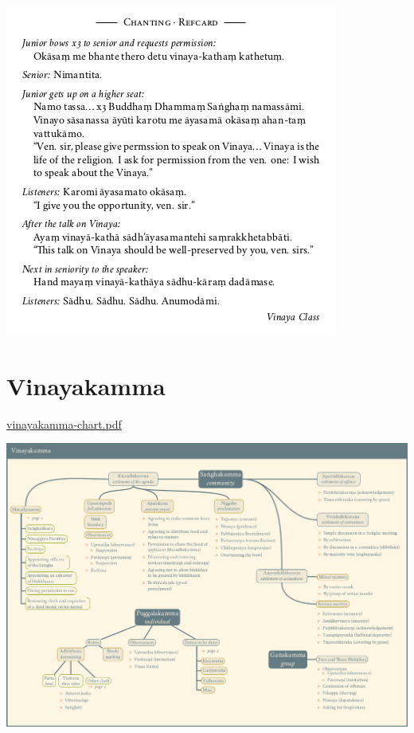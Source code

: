 \href{./includes/docs/chanting-refcard.pdf}{\includegraphics{./includes/docs/chanting-refcard-thumb.png}}

\section{Vinayakamma}

\href{./includes/docs/vinayakamma-chart.pdf}{vinayakamma-chart.pdf}

\href{./includes/docs/vinayakamma-chart.pdf}{\includegraphics{./includes/docs/vinayakamma-chart-thumb.png}}

